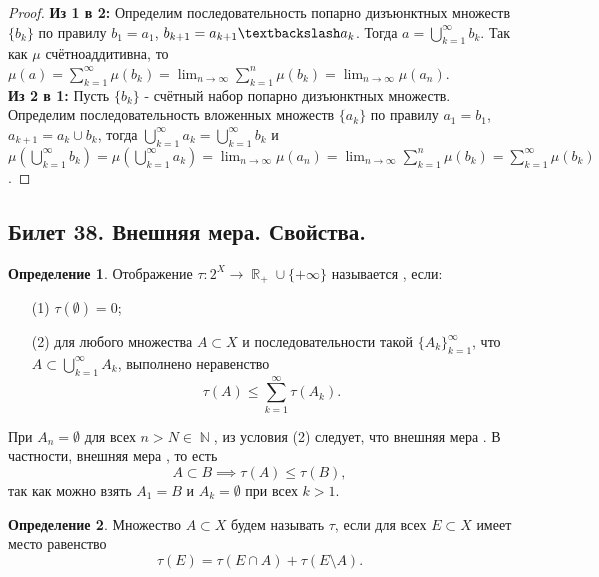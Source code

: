 \documentclass[a4paper]{article}
\theoremstyle{indented}
\theoremstyle{definition}
\newtheorem{defn}{Определение}
\theoremstyle{remark}
\DeclareMathOperator{\ra}{\rightarrow}
\DeclareMathOperator{\RR}{\mathbb{R}}
\DeclareMathOperator{\NN}{\mathbb{N}}
\begin{document}
\begin{proof}
\textbf{Из 1 в 2:} Определим последовательность попарно дизъюнктных множеств $\{b_k\}$ по правилу $b_1=a_1$, $b_{k+1}=a_{k+1} \textbackslash a_k$. Тогда $a = \bigcup_{k=1}^{\infty}b_k$. Так как $\mu$ счётноаддитивна, то $\mu(a) = \sum_{k=1}^{\infty} \mu(b_k) = \lim_{n \ra \infty} \sum_{k=1}^{n} \mu(b_k)  = \lim_{n \ra \infty} \mu(a_n)$.
\\
\textbf{Из 2 в 1:} Пусть $\{b_k\}$ - счётный набор попарно дизъюнктных множеств. Определим последовательность вложенных множеств $\{a_k\}$ по правилу $a_1=b_1$, $a_{k+1}=a_k \cup b_k$, тогда $\bigcup_{k=1}^{\infty} a_k = \bigcup_{k=1}^{\infty} b_k$ и  $\mu(\bigcup_{k=1}^{\infty} b_k) = \mu(\bigcup_{k=1}^{\infty} a_k) =  \lim_{n \ra \infty} \mu(a_n) = \lim_{n \ra \infty} \sum_{k=1}^{n} \mu(b_k) = \sum_{k=1}^{\infty} \mu(b_k) $.
\end{proof}

\subsection{Билет 38. Внешняя мера. Свойства.}



\begin{defn}
	Отображение $ \tau\colon 2^X\to\RR_+\cup\{+\infty\} $ называется , если:
	\begin{enumerate}
		\item[(1)] $ \tau(\emptyset)=0 $;
		\item[(2)] для любого множества $ A\subset X $ и последовательности такой $ \{A_k\}_{k=1}^{\infty} $, что $ A\subset\bigcup_{k=1}^{\infty}A_k  $, выполнено неравенство
		\begin{equation*}
			\tau(A)\le \sum_{k=1}^{\infty}{\tau(A_k)}.
		\end{equation*}
	\end{enumerate}
\end{defn}

При $ A_n=\emptyset $ для всех $ n>N \in\NN $, из условия (2) следует, что внешняя мера . В частности, внешняя мера , то есть 
$$ A\subset B \implies \tau(A)\le \tau(B), $$
так как можно взять $ A_1=B $ и $ A_k=\emptyset $ при всех $ k>1 $.

\begin{defn}
	Множество $ A\subset X $ будем называть  $ \tau $, если для всех $ E\subset X $ имеет место равенство
	\begin{equation}\label{eq:6}
		\tau(E)=\tau(E\cap A)+\tau(E\setminus A).
	\end{equation}
\end{defn}
\end{document}
